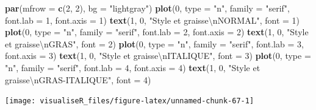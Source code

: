 \documentclass[]{article}
\newenvironment{Shaded}{\begin{snugshade}}{\end{snugshade}}
\newcommand{\CharTok}[1]{\textcolor[rgb]{0.31,0.60,0.02}{#1}}
\newcommand{\DataTypeTok}[1]{\textcolor[rgb]{0.13,0.29,0.53}{#1}}
\newcommand{\DecValTok}[1]{\textcolor[rgb]{0.00,0.00,0.81}{#1}}
\newcommand{\KeywordTok}[1]{\textcolor[rgb]{0.13,0.29,0.53}{\textbf{#1}}}
\newcommand{\NormalTok}[1]{#1}
\newcommand{\StringTok}[1]{\textcolor[rgb]{0.31,0.60,0.02}{#1}}
\begin{document}
\begin{Shaded}
\begin{Highlighting}[]
\KeywordTok{par}\NormalTok{(}\DataTypeTok{mfrow =} \KeywordTok{c}\NormalTok{(}\DecValTok{2}\NormalTok{, }\DecValTok{2}\NormalTok{), }\DataTypeTok{bg =} \StringTok{"lightgray"}\NormalTok{)}
\KeywordTok{plot}\NormalTok{(}\DecValTok{0}\NormalTok{, }\DataTypeTok{type =} \StringTok{"n"}\NormalTok{, }\DataTypeTok{family =} \StringTok{"serif"}\NormalTok{, }\DataTypeTok{font.lab =} \DecValTok{1}\NormalTok{, }\DataTypeTok{font.axis =} \DecValTok{1}\NormalTok{)}
\KeywordTok{text}\NormalTok{(}\DecValTok{1}\NormalTok{, }\DecValTok{0}\NormalTok{, }\StringTok{"Style et graisse}\CharTok{\textbackslash{}n}\StringTok{NORMAL"}\NormalTok{, }\DataTypeTok{font =} \DecValTok{1}\NormalTok{)}
\KeywordTok{plot}\NormalTok{(}\DecValTok{0}\NormalTok{, }\DataTypeTok{type =} \StringTok{"n"}\NormalTok{, }\DataTypeTok{family =} \StringTok{"serif"}\NormalTok{, }\DataTypeTok{font.lab =} \DecValTok{2}\NormalTok{, }\DataTypeTok{font.axis =} \DecValTok{2}\NormalTok{)}
\KeywordTok{text}\NormalTok{(}\DecValTok{1}\NormalTok{, }\DecValTok{0}\NormalTok{, }\StringTok{"Style et graisse}\CharTok{\textbackslash{}n}\StringTok{GRAS"}\NormalTok{, }\DataTypeTok{font =} \DecValTok{2}\NormalTok{)}
\KeywordTok{plot}\NormalTok{(}\DecValTok{0}\NormalTok{, }\DataTypeTok{type =} \StringTok{"n"}\NormalTok{, }\DataTypeTok{family =} \StringTok{"serif"}\NormalTok{, }\DataTypeTok{font.lab =} \DecValTok{3}\NormalTok{, }\DataTypeTok{font.axis =} \DecValTok{3}\NormalTok{)}
\KeywordTok{text}\NormalTok{(}\DecValTok{1}\NormalTok{, }\DecValTok{0}\NormalTok{, }\StringTok{"Style et graisse}\CharTok{\textbackslash{}n}\StringTok{ITALIQUE"}\NormalTok{, }\DataTypeTok{font =} \DecValTok{3}\NormalTok{)}
\KeywordTok{plot}\NormalTok{(}\DecValTok{0}\NormalTok{, }\DataTypeTok{type =} \StringTok{"n"}\NormalTok{, }\DataTypeTok{family =} \StringTok{"serif"}\NormalTok{, }\DataTypeTok{font.lab =} \DecValTok{4}\NormalTok{, }\DataTypeTok{font.axis =} \DecValTok{4}\NormalTok{)}
\KeywordTok{text}\NormalTok{(}\DecValTok{1}\NormalTok{, }\DecValTok{0}\NormalTok{, }\StringTok{"Style et graisse}\CharTok{\textbackslash{}n}\StringTok{GRAS-ITALIQUE"}\NormalTok{, }\DataTypeTok{font =} \DecValTok{4}\NormalTok{)}
\end{Highlighting}
\end{Shaded}

\begin{center}\texttt{[image: visualiseR\_files/figure-latex/unnamed-chunk-67-1]} \end{center}
\end{document}
